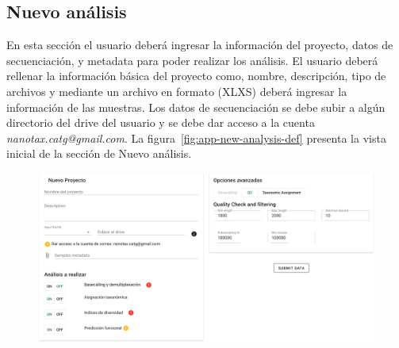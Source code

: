 \begin{itemize}


    


\subsection{Nuevo análisis}
En esta sección el usuario deberá ingresar la información del proyecto, datos de secuenciación, y metadata para poder realizar los análisis. 
El usuario deberá rellenar la información básica del proyecto como, nombre, descripción, tipo de archivos y mediante un archivo en formato (XLXS) deberá ingresar la información de las muestras. %
Los datos de secuenciación se debe subir a algún directorio del drive del usuario y se debe dar acceso a la cuenta \textit{nanotax.catg@gmail.com}.
La figura~\ref{fig:app-new-analysis-def} presenta la vista inicial de la sección de Nuevo análisis.

\begin{figure}[H]
    \includegraphics[width=1\linewidth]{images/app/newAnalysis/new-analysis-def.png}


\end{figure}
\end{itemize}

